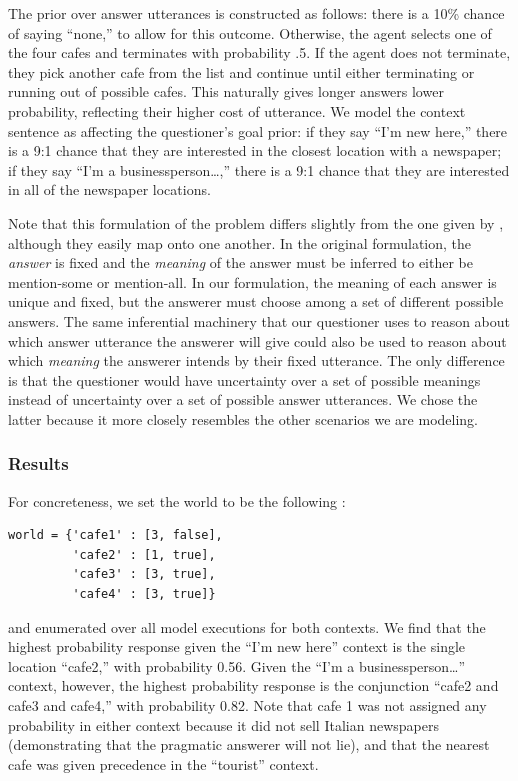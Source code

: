 \documentclass[12pt, floatsintext, man]{apa6}
\begin{document}
The prior over answer utterances is constructed as follows: there is a 10\% chance of saying ``none,'' to allow for this outcome. Otherwise, the agent selects one of the four cafes and terminates with probability .5. If the agent does not terminate, they pick another cafe from the list and continue until either terminating or running out of possible cafes. This naturally gives longer answers lower probability, reflecting their higher cost of utterance. We model the context sentence as affecting the questioner's goal prior: if they say ``I'm new here,'' there is a 9:1 chance that they are interested in the closest location with a newspaper; if they say ``I'm a businessperson\dots,'' there is a 9:1 chance that they are interested in all of the newspaper locations. 

Note that this formulation of the problem differs slightly from the one given by , although they easily map onto one another. In the original formulation, the \emph{answer} is fixed and the \emph{meaning} of the answer must be inferred to either be mention-some or mention-all. In our formulation, the meaning of each answer is unique and fixed, but the answerer must choose among a set of different possible answers. The same inferential machinery that our questioner uses to reason about which answer utterance the answerer will give could also be used to reason about which \emph{meaning} the answerer intends by their fixed utterance. The only difference is that the questioner would have uncertainty over a set of possible meanings instead of uncertainty over a set of possible answer utterances. We chose the latter because it more closely resembles the other scenarios we are modeling.

\subsubsection{Results}

For concreteness, we set the world to be the following :

\begin{lstlisting}
world = {'cafe1' : [3, false],
         'cafe2' : [1, true],
         'cafe3' : [3, true],
         'cafe4' : [3, true]}
\end{lstlisting}
and enumerated over all model executions for both contexts. We find that the highest probability response given the ``I'm new here'' context is the single location ``cafe2,'' with probability 0.56. Given the ``I'm a businessperson\dots'' context, however, the highest probability response is the conjunction ``cafe2 and cafe3 and cafe4,'' with probability 0.82. Note that cafe 1 was not assigned any probability in either context because it did not sell Italian newspapers (demonstrating that the pragmatic answerer will not lie), and that the nearest cafe was given precedence in the ``tourist'' context. 
\end{document}
